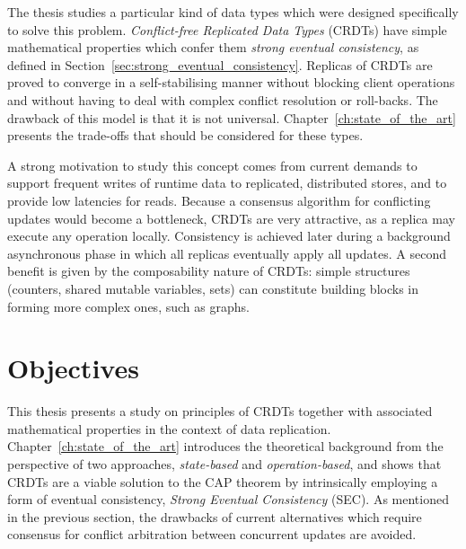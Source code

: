 The thesis studies a particular kind of data types which were designed
specifically to solve this problem. \textit{Conflict-free Replicated Data Types}
(CRDTs) have simple mathematical properties which confer them \textit{strong
eventual consistency}, as defined in
Section~\ref{sec:strong_eventual_consistency}. Replicas of CRDTs are proved to
converge in a self-stabilising manner without blocking client operations and
without having to deal with complex conflict resolution or roll-backs. The
drawback of this model is that it is not universal.
Chapter~\ref{ch:state_of_the_art} presents the trade-offs that should be
considered for these types.

A strong motivation to study this concept comes from current demands to support
frequent writes of runtime data to replicated, distributed stores, and to
provide low latencies for reads. Because a consensus algorithm for conflicting
updates would become a bottleneck, CRDTs are very attractive, as a replica may
execute any operation locally. Consistency is achieved later during a
background asynchronous phase in which all replicas eventually apply all
updates. A second benefit is given by the composability nature of CRDTs: simple
structures (counters, shared mutable variables, sets) can constitute building
blocks in forming more complex ones, such as graphs.

\section{Objectives}
\label{sec:objectives}

This thesis presents a study on principles of CRDTs together with associated
mathematical properties in the context of data replication.
Chapter~\ref{ch:state_of_the_art} introduces the theoretical background from the
perspective of two approaches, \textit{state-based} and
\textit{operation-based}, and shows that CRDTs are a viable solution to the CAP
theorem by intrinsically employing a form of eventual consistency,
\textit{Strong Eventual Consistency} (SEC). As mentioned in the previous
section, the drawbacks of current alternatives which require consensus for
conflict arbitration between concurrent updates are avoided.


